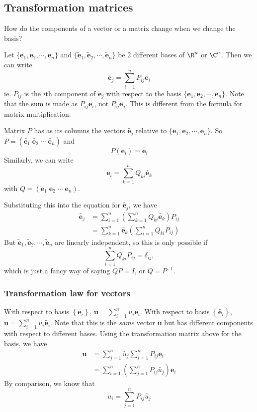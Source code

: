 \documentclass[a4paper]{article}
\begin{document}
\subsection{Transformation matrices}
How do the components of a vector or a matrix change when we change the basis?

Let $\{\mathbf{e}_1, \mathbf{e}_2, \cdots, \mathbf{e}_n\}$ and $\{\tilde{\mathbf{e}}_1, \tilde{\mathbf{e}}_2,\cdots,  \tilde{\mathbf{e}}_n\}$ be 2 different bases of $\R^n$ or $\C^n$. Then we can write
\[
  \tilde{\mathbf{e}_j} = \sum_{i = 1}^n P_{ij}\mathbf{e}_i
\]
ie. $P_{ij}$ is the $i$th component of $\tilde{\mathbf{e}_j}$ with respect to the basis $\{\mathbf{e}_1, \mathbf{e}_2, \cdots, \mathbf{e}_n\}$. Note that the sum is made as $P_{ij}\mathbf{e}_i$, not $P_{ij}\mathbf{e}_j$. This is different from the formula for matrix multiplication.

Matrix $P$ has as its columns the vectors $\tilde{\mathbf{e}_j}$ relative to $\{\mathbf{e}_1, \mathbf{e}_2, \cdots, \mathbf{e}_n\}$. So $P = (\tilde{\mathbf{e}_1}\; \tilde{\mathbf{e}_2}\; \cdots \; \tilde{\mathbf{e}_n})$ and
\[
  P(\mathbf{e}_i) = \tilde{\mathbf{e}_i}
\]
Similarly, we can write
\[
  \mathbf{e}_i = \sum_{k = 1}^nQ_{ki} \tilde{\mathbf{e}_k}
\]
with $Q = (\mathbf{e}_1\; \mathbf{e}_2\;\cdots\;\mathbf{e}_n)$.

Substituting this into the equation for $\tilde{\mathbf{e}_j}$, we have
\begin{align*}
  \tilde{\mathbf{e}_j} &= \sum_{i = 1}^n\left(\sum_{k = 1}^{n} Q_{ki}\tilde{\mathbf{e}_k}\right)P_{ij}\\
  &= \sum_{k = 1}^n \tilde{\mathbf{e}_k} \left(\sum_{i = 1}^n Q_{ki}P_{ij}\right)
\end{align*}
But $\tilde{\mathbf{e}}_1, \tilde{\mathbf{e}}_2,\cdots,  \tilde{\mathbf{e}}_n$ are linearly independent, so this is only possible if
\[
  \sum_{i = 1}^n Q_{ki}P_{ij} = \delta_{ij},
\]
which is just a fancy way of saying $QP = I$, or $Q = P^{-1}$.
\subsubsection{Transformation law for vectors}
With respect to basis $\left\{\mathbf{e}_i\right\}$, $\mathbf{u} = \sum_{i = 1}^n u_i\mathbf{e}_i$.
With respect to basis $\left\{\tilde{\mathbf{e}_i}\right\}$, $\mathbf{u} = \sum_{i = 1}^n \tilde{u_i}\tilde{\mathbf{e}_i}$. Note that this is the \emph{same} vector $\mathbf{u}$ but has different components with respect to different bases. Using the transformation matrix above for the basis, we have
\begin{align*}
  \mathbf{u} &= \sum_{j= 1}^n \tilde{u_j} \sum_{i = 1}^{n}P_{ij}\mathbf{e}_i\\
  &= \sum_{i = 1}^n \left(\sum_{j = 1}^n P_{ij}\tilde{u_j}\right) \mathbf{e}_i
\end{align*}
By comparison, we know that
\[
  u_i = \sum_{j = 1}^n P_{ij}\tilde{u_j}
\]
\end{document}
